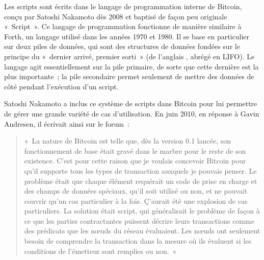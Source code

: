 Les scripts sont écrits dans le langage de programmation interne de Bitcoin, conçu par Satoshi Nakamoto dès 2008 et baptisé de façon peu originale «~Script~». Ce langage de programmation fonctionne de manière similaire à Forth, un langage utilisé dans les années 1970 et 1980. Il se base en particulier sur deux piles de données, qui sont des structures de données fondées sur le principe du «~dernier arrivé, premier sorti~» (de l'anglais , abrégé en LIFO). Le langage agit essentiellement sur la pile primaire, de sorte que cette dernière est la plus importante~; la pile secondaire permet seulement de mettre des données de côté pendant l'exécution d'un script.

Satoshi Nakamoto a inclus ce système de scripts dans Bitcoin pour lui permettre de gérer une grande variété de cas d'utilisation. En juin 2010, en réponse à Gavin Andresen, il écrivait ainsi sur le forum~:

\begin{quote}
«~La nature de Bitcoin est telle que, dès la version 0.1 lancée, son fonctionnement de base était gravé dans le marbre pour le reste de son existence. C'est pour cette raison que je voulais concevoir Bitcoin pour qu'il supporte tous les types de transaction auxquels je pouvais penser. Le problème était que chaque élément requérait un code de prise en charge et des champs de données spéciaux, qu'il soit utilisé ou non, et ne pouvait couvrir qu'un cas particulier à la fois. Ç'aurait été une explosion de cas particuliers. La solution était script, qui généralisait le problème de façon à ce que les parties contractantes puissent décrire leurs transactions comme des prédicats que les nœuds du réseau évaluaient. Les nœuds ont seulement besoin de comprendre la transaction dans la mesure où ils évaluent si les conditions de l'émetteur sont remplies ou non.~»
\end{quote} %

